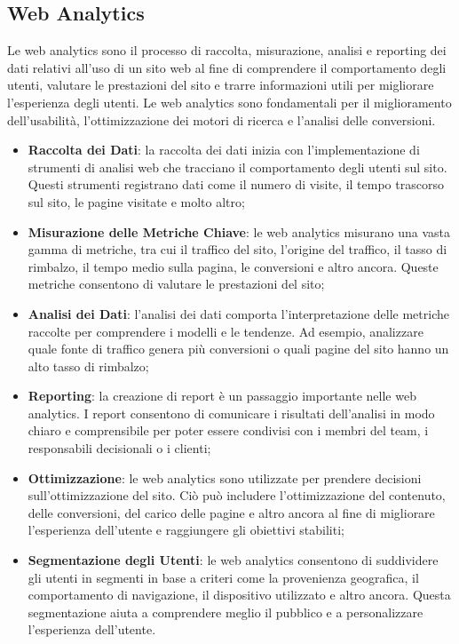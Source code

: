 \documentclass[target=bach,aauheader=]{thud}
\begin{document}
\subsection{Web Analytics}\label{subsec:umami}
Le web analytics sono il processo di raccolta, misurazione, analisi e reporting dei dati relativi all'uso di un sito web al fine di comprendere il comportamento degli utenti, valutare le prestazioni del sito e trarre informazioni utili per  migliorare l'esperienza degli utenti. \cite{cooper2012analytics}
Le web analytics sono fondamentali per il miglioramento dell'usabilità, l'ottimizzazione dei motori di ricerca e l'analisi delle conversioni.
\begin{itemize}
    \item \textbf{Raccolta dei Dati}: la raccolta dei dati inizia con l'implementazione di strumenti di analisi web che tracciano il comportamento degli utenti sul sito. Questi strumenti registrano dati come il numero di visite, il tempo trascorso sul sito, le pagine visitate e molto altro;
    \item \textbf{Misurazione delle Metriche Chiave}: le web analytics misurano una vasta gamma di metriche, tra cui il traffico del sito, l'origine del traffico, il tasso di rimbalzo, il tempo medio sulla pagina, le conversioni e altro ancora. Queste metriche consentono di valutare le prestazioni del sito;
    \item \textbf{Analisi dei Dati}: l'analisi dei dati comporta l'interpretazione delle metriche raccolte per comprendere i modelli e le tendenze. Ad esempio, analizzare quale fonte di traffico genera più conversioni o quali pagine del sito hanno un alto tasso di rimbalzo;
    \item \textbf{Reporting}: la creazione di report è un passaggio importante nelle web analytics. I report consentono di comunicare i risultati dell'analisi in modo chiaro e comprensibile per poter essere condivisi con i membri del team, i responsabili decisionali o i clienti;
    \item \textbf{Ottimizzazione}: le web analytics sono utilizzate per prendere decisioni sull'ottimizzazione del sito. Ciò può includere l'ottimizzazione del contenuto, delle conversioni, del carico delle pagine e altro ancora al fine di migliorare l'esperienza dell'utente e raggiungere gli obiettivi stabiliti;
    \item \textbf{Segmentazione degli Utenti}: le web analytics consentono di suddividere gli utenti in segmenti in base a criteri come la provenienza geografica, il comportamento di navigazione, il dispositivo utilizzato e altro ancora. Questa segmentazione aiuta a comprendere meglio il pubblico e a personalizzare l'esperienza dell'utente.
\end{itemize}
\end{document}
